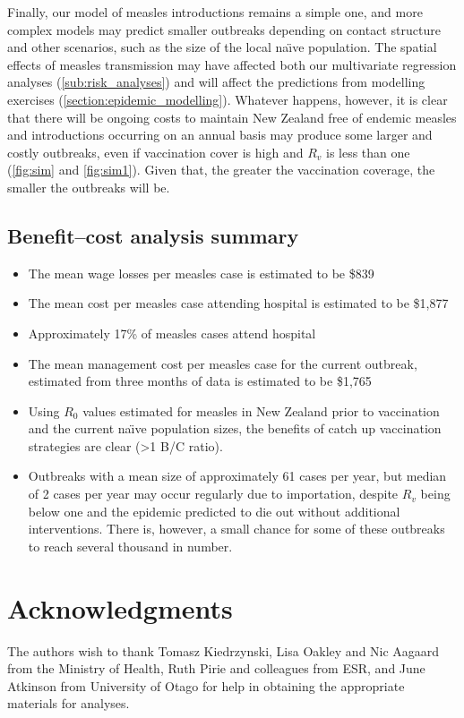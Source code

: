\documentclass{article}
\begin{document}
Finally, our model of measles introductions remains a simple one, and more complex models may predict smaller outbreaks depending on contact structure and other scenarios, such as the size of the local na\"{\i}ve population. The spatial effects of measles transmission may have affected both our multivariate regression analyses (\autoref{sub:risk_analyses}) and will affect the predictions from modelling exercises (\autoref{section:epidemic_modelling}). Whatever happens, however, it is clear that there will be ongoing costs to maintain New Zealand free of endemic measles and introductions occurring on an annual basis may produce some larger and costly outbreaks, even if vaccination cover is high and $R_v$ is less than one (\autoref{fig:sim} and \autoref{fig:sim1}). Given that, the greater the vaccination coverage, the smaller the outbreaks will be.

\subsection{Benefit--cost analysis summary}
\begin{itemize}
\item The mean wage losses per measles case is estimated to be \$839
\item The mean cost per measles case attending hospital is estimated to be \$1,877
\item Approximately 17\% of measles cases attend hospital
\item The mean management cost per measles case for the current outbreak, estimated from three months of data is estimated to be \$1,765
\item Using $R_0$ values estimated for measles in New Zealand prior to vaccination and the current na\"{\i}ve population sizes, the benefits of catch up vaccination strategies are clear (>1 B/C ratio).
\item Outbreaks with a mean size of approximately 61 cases per year, but median of 2 cases per year may occur regularly due to importation, despite $R_v$ being below one and the epidemic predicted to die out without additional interventions. There is, however, a small chance for some of these outbreaks to reach several thousand in number.
\end{itemize}

\section{Acknowledgments}
The authors wish to thank Tomasz Kiedrzynski, Lisa Oakley and Nic Aagaard from the Ministry of Health, Ruth Pirie and colleagues from ESR, and June Atkinson from University of Otago for help in obtaining the appropriate materials for analyses.
\end{document}
